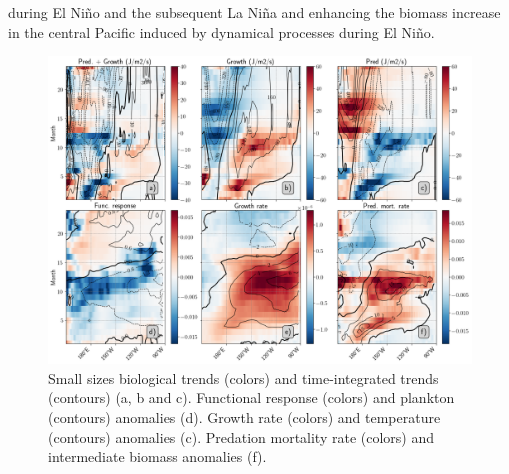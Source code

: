 during El Niño and the subsequent La Niña and enhancing the biomass increase in the central Pacific induced by dynamical processes during El Niño.  

\begin{figure}[h!tp]
	\centering
	\includegraphics[scale=0.4]{figs/fig8.png}	
	\caption{Small sizes biological trends (colors) and time-integrated trends (contours) (a, b and c). Functional response (colors) and plankton (contours) anomalies (d). Growth rate (colors) and temperature (contours) anomalies (c). Predation mortality rate (colors) and intermediate biomass anomalies (f).}
	\label{fig:fig8}
\end{figure}

